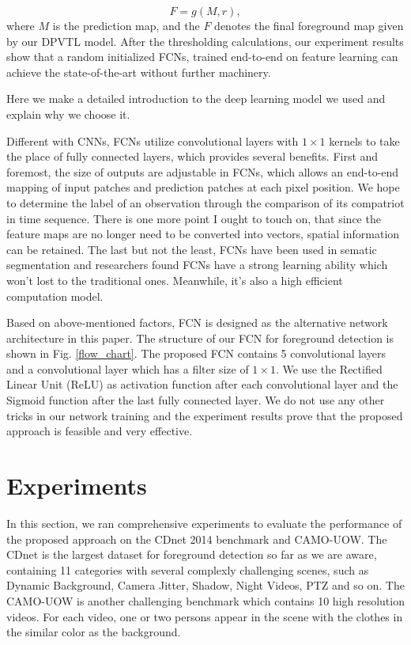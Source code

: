 \documentclass[journal]{IEEEtran}
\newcommand{\reffig}[1]{Fig. \ref{#1}}
\begin{document}
\begin{equation}
F=g(M,r) ,
\end{equation}
where $M$ is the prediction map, and the $F$ denotes the final foreground map given by our DPVTL model.
After the thresholding calculations, our experiment results show that a random initialized FCNs, trained end-to-end on feature learning can achieve the state-of-the-art without further machinery. 

Here we make a detailed introduction to the deep learning model we used and explain why we choose it.

Different with CNNs, FCNs utilize convolutional layers with $1\times 1$ kernels to take the place of fully connected layers, which provides several benefits. 
First and foremost, the size of outputs are adjustable in FCNs, which allows an end-to-end mapping of input patches and prediction patches at each pixel position. 
We hope to determine the label of an observation through the comparison of its compatriot in time sequence. 
There is one more point I ought to touch on, that since the feature maps are no longer need to be converted into vectors, spatial information can be retained. 
The last but not the least, FCNs have been used in sematic segmentation and researchers found FCNs have a strong learning ability which won't lost to the traditional ones. 
Meanwhile, it's also a high efficient computation model. 


Based on above-mentioned factors, FCN is designed as the alternative network architecture in this paper. 
The structure of our FCN for foreground detection is shown in \reffig{flow_chart}. 
The proposed FCN contains 5 convolutional layers and a convolutional layer which has a filter size of $1\times 1$. 
We use the Rectified Linear Unit (ReLU) as activation function after each convolutional layer and the Sigmoid function after the last fully connected layer. 
We do not use any other tricks in our network training and the experiment results prove that the proposed approach is feasible and very effective.


\section{Experiments}
\label{sec5}
In this section, we ran comprehensive experiments to evaluate the performance of the proposed approach on the CDnet 2014 benchmark\cite{CDN2014} and CAMO-UOW\cite{CAMO}. 
The CDnet is the largest dataset for foreground detection so far as we are aware, containing 11 categories with several complexly challenging scenes, such as Dynamic Background, Camera Jitter, Shadow, Night Videos, PTZ and so on. 
The CAMO-UOW is another challenging benchmark which contains 10 high resolution videos. 
For each video, one or two persons appear in the scene with the clothes in the similar color as the background.
\end{document}
